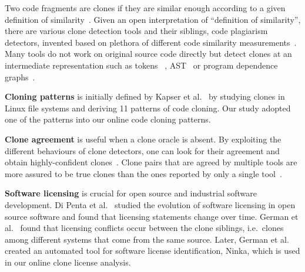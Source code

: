 \documentclass[10pt,journal,compsoc]{IEEEtran}
\begin{document}
Two code fragments are clones if they are similar enough according to
a given definition of similarity~\cite{Bellon2007}. Given an open
interpretation of ``definition of similarity'', there are various
clone detection tools and their siblings, code plagiarism detectors,
invented based on plethora of different code similarity
measurements~\cite{Roy2008, Ragkhitwetsagul2016,Svajlenko2014}. 
Many tools do not work on original source code directly but detect clones
at an intermediate representation such as tokens ~\cite{Sajnani2016,Kamiya2002,Li2006,Gode2009,Burrows2007, Smith2009, Duric2012, Prechelt2002, Schleimer2003}, AST~\cite{Baxter1998,Jiang2007a} or program dependence
graphs~\cite{Krinke2001,Komondoor2001}. 

\textbf{Cloning patterns} is initially defined 
by Kapser et al.~\cite{Kapser2003,Kapser2008} by studying clones in 
Linux file systems and deriving 11 patterns of code cloning. 
Our study adopted one of the patterns into our online code cloning patterns.

\textbf{Clone agreement} is useful when a clone oracle is
absent. %
By exploiting the different behaviours of clone detectors,
one can look for their agreement and obtain
highly-confident clones~\cite{Bellon2007,Wang2013}. %
Clone pairs that are agreed by multiple tools are more assured to be true
clones than the ones reported by only a single
tool~\cite{Wang2013,cr2016ssbse,Funaro2010}. 

\textbf{Software licensing} is crucial for open source and 
industrial software development. Di Penta et al.~\cite{DiPenta2010}
studied the evolution of software licensing in open source 
software and found that licensing statements change over 
time. German et al.~\cite{German2009} found that licensing 
conflicts occur between the clone siblings, i.e.~clones among 
different systems that come from the same source. Later, 
German et al.~\cite{German2010} created an automated tool 
for software license identification, Ninka, which is used
in our online clone license analysis. 
\end{document}
